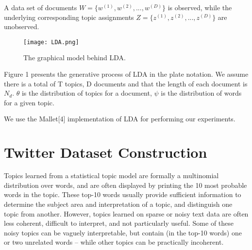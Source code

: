 \documentclass[10pt,a5paper,twoside]{article}
\begin{document}
A data set of documents $W = \lbrace w^(1) , w^(2) , ..., w^(D) \rbrace $ is observed, while the underlying corresponding topic assignments $Z = \lbrace z^(1) , z^(2) , ..., z^(D) \rbrace $ are unobserved. 
\\




\begin{figure*}[t!]
\begin{center}
\texttt{[image: LDA.png]}
\end{center}
\caption{\footnotesize The graphical model behind LDA.} \label{fig:dist}
\end{figure*}

Figure 1 presents the generative process of LDA in the plate notation. We assume there is a total of T topics, D documents and that the length of each document is $N_d$. $\theta$ is the distribution of topics for a document, $\psi$ is the distribution of words for a given topic.

We use the Mallet[4] implementation of LDA for performing our experiments.


\section{Twitter Dataset Construction}

Topics learned from a statistical topic model are formally a multinomial distribution over words, and are often displayed by printing the 10 most probable words in the topic. These top-10 words usually provide sufficient information to determine the subject area and interpretation of a topic, and distinguish one topic from another. However, topics learned on sparse or noisy text data are
often less coherent, difficult to interpret, and not particularly useful. Some of these noisy topics can be vaguely interpretable, but contain (in the top-10 words) one or two unrelated words – while other topics can be practically incoherent. 
\end{document}
